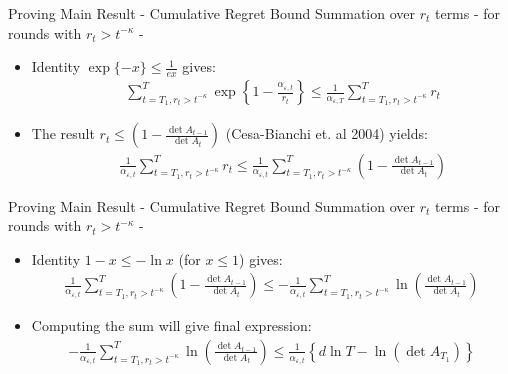 \documentclass{beamer}
\begin{document}
\begin{frame}{Proving Main Result - Cumulative Regret Bound}
Summation over $r_t$ terms - for rounds with $r_t> t^{-\kappa}$ - \newline
\begin{itemize}
\item Identity $\exp\{-x\}\leq\frac{1}{ex}$ gives:
\begin{eqnarray*}
&&\sum\limits_{t=T_1,r_t> t^{-\kappa}}^{T}\exp\left\{1-\frac{\alpha_{\varepsilon,t}}{r_t}\right\}\leq \frac{1}{\alpha_{\varepsilon,T}}\sum\limits_{t=T_1,r_t> t^{-\kappa}}^{T}r_t\nonumber
\end{eqnarray*}
\item The result $ r_t\leq\left(1-\frac{\det{A_{t-1}}}{\det{A_t}}\right)$ (Cesa-Bianchi et. al 2004) yields:
\begin{eqnarray*}
&&\frac{1}{\alpha_{\varepsilon,t}}\sum\limits_{t=T_1,r_t> t^{-\kappa}}^{T}r_t\leq\frac{1}{\alpha_{\varepsilon,t}}\sum\limits_{t=T_1,r_t> t^{-\kappa}}^{T}\left(1-\frac{\det{A_{t-1}}}{\det{A_t}}\right)\nonumber
\end{eqnarray*}
\end{itemize}
\end{frame}

\begin{frame}{Proving Main Result - Cumulative Regret Bound}
Summation over $r_t$ terms - for rounds with $r_t> t^{-\kappa}$ - \newline
\begin{itemize}
\item Identity $1-x\leq -\ln{x}$ (for $x\leq1$) gives:
\begin{eqnarray*}
\frac{1}{\alpha_{\varepsilon,t}}\sum\limits_{t=T_1,r_t> t^{-\kappa}}^{T}\left(1-\frac{\det{A_{t-1}}}{\det{A_t}}\right)\leq -\frac{1}{\alpha_{\varepsilon,t}}\sum\limits_{t=T_1,r_t> t^{-\kappa}}^{T}\ln{\left(\frac{\det{A_{t-1}}}{\det{A_t}}\right)}
\end{eqnarray*}
\item Computing the sum will give final expression:
\begin{eqnarray*}
 -\frac{1}{\alpha_{\varepsilon,t}}\sum\limits_{t=T_1,r_t> t^{-\kappa}}^{T}\ln{\left(\frac{\det{A_{t-1}}}{\det{A_t}}\right)}\leq \frac{1}{\alpha_{\varepsilon,t}}\left\{d\ln{T}- \ln\left(\det{A_{T_1}}\right)\right\}
\end{eqnarray*}
\end{itemize}
\end{frame}
\end{document}
